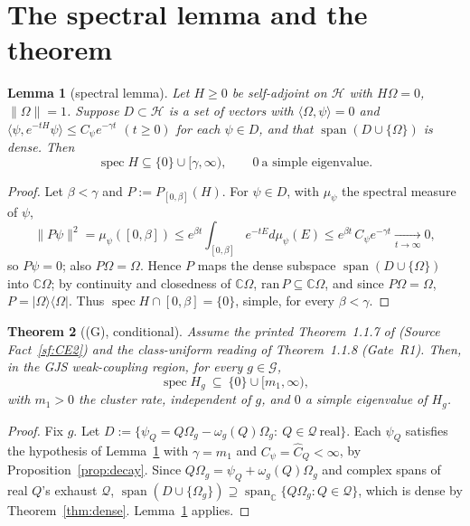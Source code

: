 \documentclass[11pt,a4paper]{article}
\theoremstyle{plain}
\newtheorem{theorem}{Theorem}[section]
\newtheorem{lemma}[theorem]{Lemma}
\theoremstyle{definition}
\newcommand{\Om}{\Omega}
\newcommand{\G}{\mathcal{G}}
\newcommand{\Q}{\mathcal{Q}}
\newcommand{\HH}{\mathcal{H}}
\newcommand{\ip}[2]{\langle #1,#2\rangle}
\DeclareMathOperator{\spec}{spec}
\DeclareMathOperator{\Span}{span}
\begin{document}
\section{The spectral lemma and the theorem}\label{sec:main}

\begin{lemma}[spectral lemma]\label{lem:spectral}
Let $H\ge0$ be self-adjoint on $\HH$ with $H\Om=0$, $\|\Om\|=1$. Suppose $D\subset\HH$ is a set
of vectors with $\ip{\Om}{\psi}=0$ and
$\ip{\psi}{e^{-tH}\psi}\le C_\psi e^{-\gamma t}$ $(t\ge0)$ for each $\psi\in D$, and that
$\Span(D\cup\{\Om\})$ is dense. Then
\[
  \spec H\subseteq\{0\}\cup[\gamma,\infty),\qquad 0\ \text{a simple eigenvalue.}
\]
\end{lemma}

\begin{proof}
Let $\beta<\gamma$ and $P:=P_{[0,\beta]}(H)$. For $\psi\in D$, with $\mu_\psi$ the spectral
measure of $\psi$,
\[
  \|P\psi\|^2=\mu_\psi([0,\beta])\le e^{\beta t}\!\int_{[0,\beta]}e^{-tE}d\mu_\psi(E)
  \le e^{\beta t}\,C_\psi e^{-\gamma t}\xrightarrow[t\to\infty]{}0 ,
\]
so $P\psi=0$; also $P\Om=\Om$. Hence $P$ maps the dense subspace $\Span(D\cup\{\Om\})$ into
$\mathbb C\Om$; by continuity and closedness of $\mathbb C\Om$,
$\mathrm{ran}\,P\subseteq\mathbb C\Om$, and since $P\Om=\Om$, $P=|\Om\rangle\langle\Om|$. Thus
$\spec H\cap[0,\beta]=\{0\}$, simple, for every $\beta<\gamma$.
\end{proof}

\begin{theorem}[(G), conditional]\label{thm:G}
Assume the printed Theorem~1.1.7 of \cite{GJS} (Source Fact~\ref{sf:CE2}) and the class-uniform
reading of Theorem~1.1.8 (Gate~R1). Then, in the GJS weak-coupling region, for \emph{every}
$g\in\G$,
\[
  \spec H_g\ \subseteq\ \{0\}\cup[m_1,\infty),
\]
with $m_1>0$ the cluster rate, independent of $g$, and $0$ a simple eigenvalue of $H_g$.
\end{theorem}

\begin{proof}
Fix $g$. Let $D:=\{\psi_Q=Q\Om_g-\omega_g(Q)\Om_g:\ Q\in\Q\ \text{real}\}$. Each $\psi_Q$
satisfies the hypothesis of Lemma~\ref{lem:spectral} with $\gamma=m_1$ and
$C_\psi=\widehat C_Q<\infty$, by Proposition~\ref{prop:decay}. Since
$Q\Om_g=\psi_Q+\omega_g(Q)\Om_g$ and complex spans of real $Q$'s exhaust $\Q$,
$\Span(D\cup\{\Om_g\})\supseteq\Span_{\mathbb C}\{Q\Om_g:Q\in\Q\}$, which is dense by
Theorem~\ref{thm:dense}. Lemma~\ref{lem:spectral} applies.
\end{proof}
\end{document}
